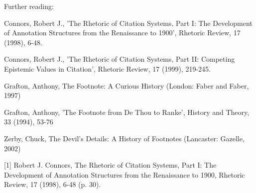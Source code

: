 Further reading:

Connors, Robert J., 'The Rhetoric of Citation Systems, Part I: The Development of Annotation Structures from the Renaissance to 1900', Rhetoric Review, 17 (1998), 6-48.

Connors, Robert J., 'The Rhetoric of Citation Systems, Part II: Competing Epistemic Values in Citation', Rhetoric Review, 17 (1999), 219-245.

Grafton, Anthony, The Footnote: A Curious History (London: Faber and Faber, 1997)

Grafton, Anthony, 'The Footnote from De Thou to Ranke', History and Theory, 33 (1994), 53-76

Zerby, Chuck, The Devil's Details: A History of Footnotes (Lancaster: Gazelle, 2002)

[1] Robert J. Connors, The Rhetoric of Citation Systems, Part I: The Development of Annotation Structures from the Renaissance to 1900, Rhetoric Review, 17 (1998), 6-48 (p. 30).
